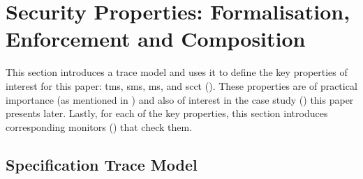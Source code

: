 \documentclass[dvipsnames]{llncs}
\begin{document}
\section{Security Properties: Formalisation, Enforcement and Composition}\label{sec:compprop}

This section introduces a trace model and uses it to define the key properties of interest for this paper: \gls*{tms}, \gls*{sms}, \gls*{ms}, and \gls*{scct} ().
These properties are of practical importance (as mentioned in ) and also of interest in the case study () this paper presents later. 
Lastly, for each of the key properties, this section introduces corresponding monitors () that check them.

\subsection{Specification Trace Model}\label{subsec:propdefs}
\end{document}
